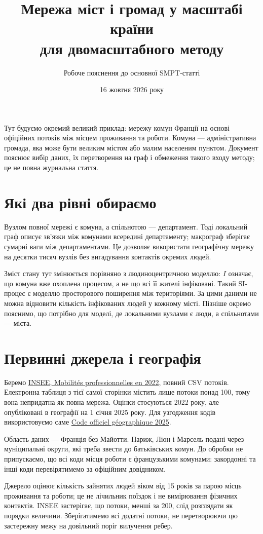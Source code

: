 \documentclass[11pt,a4paper]{article}
\title{Мережа міст і громад у масштабі країни\\для двомасштабного методу}
\author{Робоче пояснення до основної SMPT-статті}
\date{16 жовтня 2026 року}
\begin{document}
\maketitle
\noindent Тут будуємо окремий великий приклад: мережу комун Франції на основі офіційних потоків між місцем проживання та роботи. Комуна --- адміністративна громада, яка може бути великим містом або малим населеним пунктом. Документ пояснює вибір даних, їх перетворення на граф і обмеження такого входу методу; це не повна журнальна стаття.

\section{Які два рівні обираємо}
Вузлом повної мережі є комуна, а спільнотою --- департамент. Тоді локальний граф описує зв'язки між комунами всередині департаменту; макрограф зберігає сумарні ваги між департаментами. Це дозволяє використати географічну мережу на десятки тисяч вузлів без вигадування контактів окремих людей.

Зміст стану тут змінюється порівняно з людиноцентричною моделлю: $I$ означає, що комуна вже охоплена процесом, а не що всі її жителі інфіковані. Такий SI-процес є моделлю просторового поширення між територіями. За цими даними не можна відновити кількість інфікованих людей у кожному місті. Пізніше окремо пояснимо, що потрібно для моделі, де локальними вузлами є люди, а спільнотами --- міста.

\section{Первинні джерела і географія}
Беремо \href{https://www.insee.fr/fr/statistiques/8582949}{INSEE, Mobilités professionnelles en 2022}, повний CSV потоків. Електронна таблиця з тієї самої сторінки містить лише потоки понад 100, тому вона непридатна як повна мережа. Оцінки стосуються 2022 року, але опубліковані в географії на 1 січня 2025 року. Для узгодження кодів використовуємо саме \href{https://www.insee.fr/fr/information/8377162}{Code officiel géographique 2025}.

Область даних --- Франція без Майотти. Париж, Ліон і Марсель подані через муніципальні округи, які треба звести до батьківських комун. До обробки не припускаємо, що всі коди місця роботи є французькими комунами: закордонні та інші коди перевірятимемо за офіційним довідником.

Джерело оцінює кількість зайнятих людей віком від 15 років за парою місць проживання та роботи; це не лічильник поїздок і не вимірювання фізичних контактів. INSEE застерігає, що потоки, менші за 200, слід розглядати як порядки величини. Зберігатимемо всі додатні потоки, не перетворюючи цю застережну межу на довільний поріг вилучення ребер.
\end{document}
